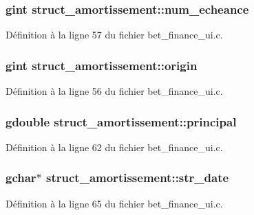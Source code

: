 \subsubsection[{num\_\-echeance}]{\setlength{\rightskip}{0pt plus 5cm}gint {\bf struct\_\-amortissement::num\_\-echeance}}\label{structstruct__amortissement_ac14e44f2597421e49c955c430a998db8}


Définition à la ligne 57 du fichier bet\_\-finance\_\-ui.c.

\subsubsection[{origin}]{\setlength{\rightskip}{0pt plus 5cm}gint {\bf struct\_\-amortissement::origin}}\label{structstruct__amortissement_a30f6b495fe541dc8b5ff5ef52b056066}


Définition à la ligne 56 du fichier bet\_\-finance\_\-ui.c.

\subsubsection[{principal}]{\setlength{\rightskip}{0pt plus 5cm}gdouble {\bf struct\_\-amortissement::principal}}\label{structstruct__amortissement_aa8b65048f5385322c113a3cf35d0c619}


Définition à la ligne 62 du fichier bet\_\-finance\_\-ui.c.

\subsubsection[{str\_\-date}]{\setlength{\rightskip}{0pt plus 5cm}gchar$\ast$ {\bf struct\_\-amortissement::str\_\-date}}\label{structstruct__amortissement_a9456558d45afe6051d2e51a94748ed4b}


Définition à la ligne 65 du fichier bet\_\-finance\_\-ui.c.

